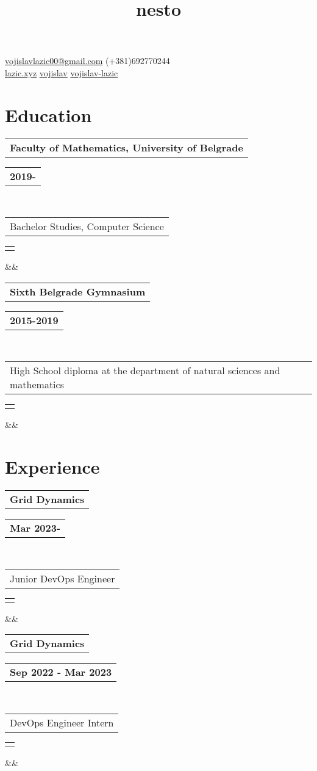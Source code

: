 \documentclass[11pt,a4paper,roman]{moderncv}        %
\makeatletter
\newcommand*{\customcventry}[7][.25em]{
  \begin{tabular}{@{}l}
    {\bfseries #4}
  \end{tabular}
  \hfill%
  \begin{tabular}{l@{}}
     {\bfseries #5}
  \end{tabular} \\
  \begin{tabular}{@{}l}
    {#3}
  \end{tabular}
  \hfill%
  \begin{tabular}{l@{}}
     {\itshape #2}
  \end{tabular}
  \ifx&#7&%
  \else{\\%
    \begin{minipage}{\maincolumnwidth}%
      \small#7%
    \end{minipage}}\fi%
  \par\addvspace{#1}}
\makeatother
\begin{document}
\makecvtitle
\title{nesto}
\vspace*{-23mm}

\begin{center}
	\faEnvelopeO\enspace \href{mail:vojislavlazic00@gmail.com}{vojislavlazic00@gmail.com} \enspace \faMobile\enspace (+381)692770244 \\
	\faGlobe\enspace \href{https://lazic.xyz}{lazic.xyz} \enspace
	\faGithub\enspace \href{https://github.com/vojislav}{vojislav} \enspace
	\faLinkedinSquare\enspace \href{https://www.linkedin.com/in/vojislav-lazic/}{vojislav-lazic}
\end{center}

\section{Education}
{\customcventry{}{Bachelor Studies, Computer Science}{Faculty of Mathematics, University of Belgrade}{2019-}{}{}}
{\customcventry{}{High School diploma at the department of natural sciences and mathematics}{Sixth Belgrade Gymnasium}{2015-2019}{}{}}


\section{Experience}
{\customcventry{}{Junior DevOps Engineer}{Grid Dynamics}{Mar 2023-}{}{}}
{\customcventry{}{DevOps Engineer Intern}{Grid Dynamics}{Sep 2022 - Mar 2023}{}{}}
\end{document}

